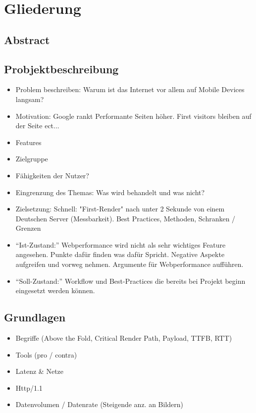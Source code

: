 \documentclass[a4paper,11pt,singlespacing]{article}
\begin{document}
\section{Gliederung} %
\label{sec:gliederung}

	\subsection{Abstract} %
	\label{sub:abstract}

	\subsection{Probjektbeschreibung}
	\label{sub:probjektbeschreibung}
		\begin{itemize}
			\item Problem beschreiben: Warum ist das Internet vor allem auf Mobile Devices langsam?
			\item Motivation: Google rankt Performante Seiten höher. First visitors bleiben auf der Seite ect...
			\item Features
			\item Zielgruppe
			\item Fähigkeiten der Nutzer?
			\item Eingrenzung des Themas: Was wird behandelt und was nicht?
			\item Zielsetzung: Schnell: "First-Render" nach unter 2 Sekunde von einem Deutschen Server (Messbarkeit).
			Best Practices, Methoden, Schranken / Grenzen
			\item "`Ist-Zustand:"' Webperformance wird nicht als sehr wichtiges Feature angesehen. Punkte dafür finden was dafür Spricht. Negative Aspekte aufgreifen und vorweg nehmen. Argumente für Webperformance aufführen.
			\item "`Soll-Zustand:"' Workflow und Best-Practices die bereits bei Projekt beginn eingesetzt werden können.
		\end{itemize}


	\subsection{Grundlagen}
	\label{sub:grundlagen}
		\begin{itemize}
			\item Begriffe (Above the Fold, Critical Render Path, Payload, TTFB, RTT)
			\item Tools (pro / contra)
			\item Latenz \& Netze
			\item Http/1.1
			\item Datenvolumen / Datenrate (Steigende anz. an Bildern)
		\end{itemize}
\end{document}
